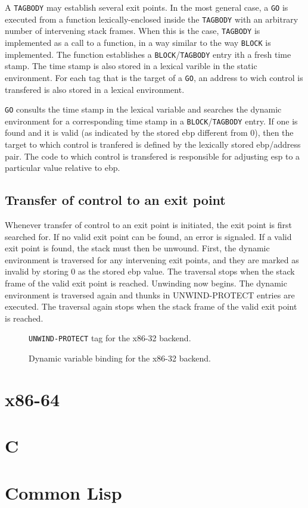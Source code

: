 A \texttt{TAGBODY} may establish several exit points.  In the most
general case, a \texttt{GO} is executed from a function
lexically-enclosed inside the \texttt{TAGBODY} with an arbitrary
number of intervening stack frames.  When this is the case,
\texttt{TAGBODY} is implemented as a call to a function, in a way
similar to the way \texttt{BLOCK} is implemented.  The function
establishes a \texttt{BLOCK}/\texttt{TAGBODY} entry ith a fresh time
stamp.  The time stamp is also stored in a lexical varible in the
static environment.  For each tag that is the target of a \texttt{GO},
an address to wich control is transfered is also stored in a lexical
environment.

\texttt{GO} consults the time stamp in the lexical variable and
searches the dynamic environment for a corresponding time stamp in a
\texttt{BLOCK}/\texttt{TAGBODY} entry.  If one is found and it is
valid (as indicated by the stored ebp different from 0), then the
target to which control is tranfered is defined by the lexically
stored ebp/address pair.  The code to which control is transfered is
responsible for adjusting esp to a particular value relative to ebp.

\subsection{Transfer of control to an exit point}

Whenever transfer of control to an exit point is initiated, the exit
point is first searched for.  If no valid exit point can be found, an
error is signaled.  If a valid exit point is found, the stack must
then be unwound.  First, the dynamic environment is traversed for any
intervening exit points, and they are marked as invalid by storing 0
as the stored ebp value.  The traversal stops when the stack frame of
the valid exit point is reached.  Unwinding now begins.  The dynamic
environment is traversed again and thunks in UNWIND-PROTECT entries
are executed.  The traversal again stops when the stack frame of the
valid exit point is reached.

\begin{figure}
\begin{center}
\end{center}
\caption{\label{fig-x86-32-unwind-protect}
\texttt{UNWIND-PROTECT} tag for the x86-32 backend.}
\end{figure}

\begin{figure}
\begin{center}
\end{center}
\caption{\label{fig-x86-32-dynamic-binding}
Dynamic variable binding for the x86-32 backend.}
\end{figure}

\section{x86-64}

\section{C}

\section{Common Lisp}

